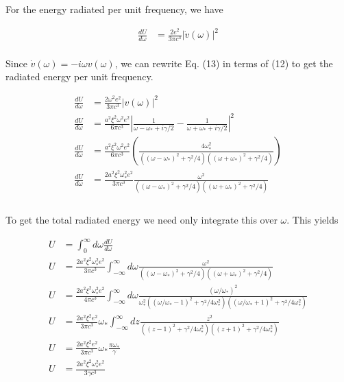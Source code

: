 \documentclass[]{article}
\begin{document}
\begin{enumerate}[a)]
For the energy radiated per unit frequency, we have


\begin{equation}
\begin{aligned}
\frac{d U}{d\omega} & = \frac{ 2 e^2}{3 \pi c^3} | \dot{v}(\omega) |^2 
\end{aligned}
\end{equation} \\

Since $\dot{v}(\omega) = -i \omega v(\omega) $, we can rewrite Eq. (13) in terms of (12) to get the radiated energy per unit frequency.

\begin{equation}
\begin{aligned}
\frac{d U}{d\omega} & = \frac{ 2 \omega^2 e^2}{3 \pi c^3} | v(\omega) |^2 \\
\frac{d U}{d\omega} & = \frac{  a^2 \xi^2 \omega^2 e^2}{6 \pi c^3} \left| \frac{1}{ \omega  - \omega_* + i \gamma  /2} -  \frac{1}{ \omega  + \omega_* + i \gamma  /2}  \right|^2 \\
%
\frac{d U}{d\omega} & = \frac{  a^2 \xi^2 \omega^2 e^2}{6 \pi c^3} \left( \frac{4 \omega_*^2  }{ \left( ( \omega  - \omega_* )^2 + \gamma^2/4 \right) \left( ( \omega  + \omega_* )^2 + \gamma^2/4 \right) } \right) \\
%
\frac{d U}{d\omega} & = \frac{ 2 a^2 \xi^2 \omega_*^2 e^2}{3 \pi c^3}  \frac{ \omega^2  }{ \left( ( \omega  - \omega_* )^2 + \gamma^2/4 \right) \left( ( \omega  + \omega_* )^2 + \gamma^2/4 \right) } \\
\end{aligned}
\end{equation} \\

To get the total radiated energy we need only integrate this over $\omega$. This yields

\begin{equation}
\begin{aligned}
U & = \int_0^{\infty} d\omega \frac{d U}{d\omega}  \\
%
U & = \frac{ 2 a^2 \xi^2 \omega_*^2 e^2}{3 \pi c^3}  \int_{-\infty}^{\infty} d\omega \frac{ \omega^2  }{ \left( ( \omega  - \omega_* )^2 + \gamma^2/4 \right) \left( ( \omega  + \omega_* )^2 + \gamma^2/4 \right) } \\
%
U & = \frac{ 2 a^2 \xi^2 \omega_*^2 e^2}{4 \pi c^3}  \int_{-\infty}^{\infty} d\omega \frac{ (\omega/\omega_*)^2  }{ \omega_*^2 \left( ( \omega/\omega_*  - 1 )^2 + \gamma^2/4\omega_*^2 \right) \left( ( \omega/\omega_*  + 1)^2 + \gamma^2/4\omega_*^2 \right) } \\
%
U & = \frac{ 2 a^2 \xi^2  e^2}{3 \pi c^3}  \omega_*  \int_{-\infty}^{\infty} dz \frac{ z^2  }{ \left( (z-1)^2 + \gamma^2/4\omega_*^2 \right) \left( ( z  + 1)^2 + \gamma^2/4\omega_*^2 \right) } \\
%
U & = \frac{ 2 a^2 \xi^2  e^2}{3 \pi c^3}  \omega_*  \frac{\pi \omega_*}{ \gamma } \\
%
U & = \frac{ 2 a^2 \xi^2 \omega_*^2 e^2}{3 \gamma c^3}  \\
\end{aligned}
\end{equation} \\


\end{enumerate}
\end{document}
